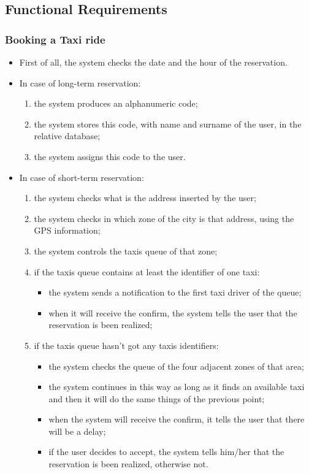 		\subsection{Functional Requirements}
		\subsubsection{Booking a Taxi ride}
		\begin{itemize}
			\item First of all, the system checks the date and the hour of the reservation. 
			\item In case of long-term reservation:
		\begin{enumerate}
			\item the system produces an alphanumeric code;
			\item the system stores this code, with name and surname of the user, in the relative database;
			\item the system assigns this code to the user.
		\end{enumerate}
			\item In case of short-term reservation:
		\begin{enumerate}
			\item the system checks what is the address inserted by the user;
			\item the system checks in which zone of the city is that address, using the GPS information;
			\item the system controls the taxis queue of that zone;
			\item if the taxis queue contains at least the identifier of one taxi:
				\begin{itemize}
					\item the system sends a notification to the first taxi driver of the queue;
					\item when it will receive the confirm, the system tells the user that the reservation is been realized;
				\end{itemize}	  
			\item if the taxis queue hasn't got any taxis identifiers:
				\begin{itemize}
					\item the system checks the queue of the four adjacent zones of that area;
					\item the system continues in this way as long as it finds an available taxi and then it will do the same things of the previous point;
					\item when the system will receive the confirm, it tells the user that there will be a delay;
					\item if the user decides to accept, the system tells him/her that the reservation is been realized, otherwise not.
				\end{itemize}
		\end{enumerate}
		\end{itemize}
